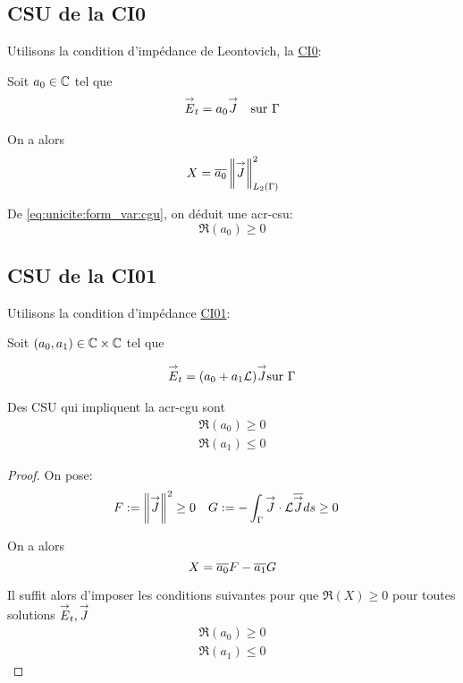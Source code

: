   \subsection{CSU de la CI0}
    Utilisons la condition d’impédance de Leontovich, la \hyperlink{ci0}{CI0}:

    Soit \(a_0 \in \mathbb C\) tel que
    \begin{align*}
      {\overset{\rightarrow}{E}}_t = a_0 {\overset{\rightarrow}{J}} && \text{sur } \Gamma
    \end{align*}

    On a alors
    \begin{equation*}
    X = {\overline{a_0}}\left\lVert {\overset{\rightarrow}{J}} \right\rVert_{L_2(\Gamma)}^2
    \end{equation*}

    De \eqref{eq:unicite:form_var:cgu}, on déduit une \gls{acr-csu}:
    \begin{equation}
    \Re\left(a_0\right) \ge 0
    \end{equation}

  \subsection{CSU de la CI01}
    Utilisons la condition d’impédance \hyperlink{ci01}{CI01}:

    Soit \((a_0, a_1) \in \mathbb C\times\mathbb C\) tel que

    \begin{align*}
      {\overset{\rightarrow}{E}}_t = (a_0 +a_1 \mathcal{L}){\overset{\rightarrow}{J}} \text{sur } \Gamma
    \end{align*}


    \begin{prop}
      Des CSU qui impliquent la \gls{acr-cgu} sont
      \begin{align}
        \Re\left(a_0\right) \ge 0\\
        \Re\left(a_1\right) \le 0
      \end{align}
    \end{prop}

    \begin{proof}
      On pose:
      \begin{align*}
        F&:= \left\lVert  {\overset{\rightarrow}{J}} \right\rVert ^2 \ge 0  & G&:= -\int_\Gamma {\overset{\rightarrow}{J}}\cdot \mathcal{L}{\overline{{\overset{\rightarrow}{J}}}} ds \ge 0
      \end{align*}

      On a alors
      \begin{equation*}
        X = {\overline{a_0}}F - {\overline{a_1}}G
      \end{equation*}

      Il suffit alors d'imposer les conditions suivantes pour que \(\Re(X)\ge0\) pour toutes solutions \({\overset{\rightarrow}{E}}_t,{\overset{\rightarrow}{J}}\)
      \begin{align}
        \Re\left(a_0\right) \ge 0\\
        \Re\left(a_1\right) \le 0
      \end{align}
    \end{proof}

